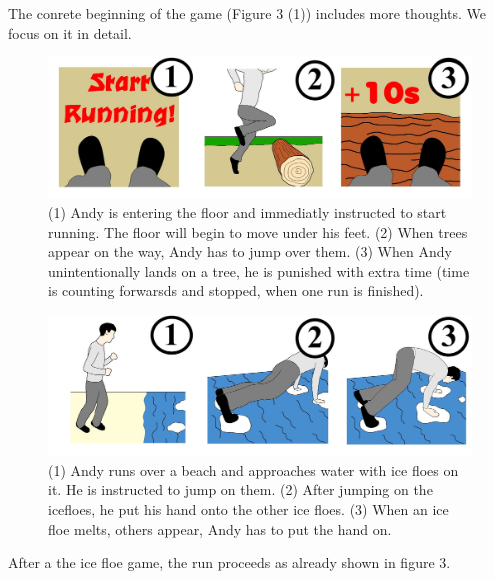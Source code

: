 \documentclass{sigchi}
\begin{document}
  The conrete beginning of the game (Figure 3 (1)) includes more thoughts. We focus on it in detail.

  \begin{figure}[!htb]
    \includegraphics[width=\linewidth]{Image_12.jpg}
  \endminipage\hfill
    \caption{(1) Andy is entering the floor and immediatly instructed to start running. The floor will begin to move under his feet. (2) When trees appear on the way, Andy has to jump over them. (3) When Andy unintentionally lands on a tree, he is punished with extra time (time is counting forwarsds and stopped, when one run is finished).}\label{fig:awesome_image3}
  \end{figure}

  \begin{figure}[!htb]
    \includegraphics[width=\linewidth]{Image_13.jpg}
  \endminipage\hfill
    \caption{(1) Andy runs over a beach and approaches water with ice floes on it. He is instructed to jump on them. (2) After jumping on the icefloes, he put his hand onto the other ice floes. (3) When an ice floe melts, others appear, Andy has to put the hand on.}\label{fig:awesome_image3}
  \end{figure}

  After a the ice floe game, the run proceeds as already shown in figure 3.
\end{document}
